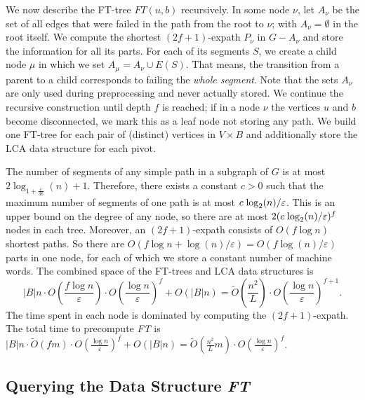 \documentclass{theoretics}
\newcommand*{\Otilde}{\widetilde{O}}
\newcommand*{\nwspace}{\hspace*{.1em}}
\newcommand{\eps}{\varepsilon}
\begin{document}
We now describe the FT-tree $FT(u,b)$ recursively.
In some node $\nu$, let $A_{\nu}$ be the set of all edges
that were failed in the path from the root to $\nu$;
with $A_{\nu} = \emptyset$ in the root itself.
We compute the shortest $(2f{+}1)$-expath $P_{\nu}$ in $G-A_{\nu}$
and store the information for all its parts.
For each of its segments $S$, we create a child node $\mu$ in which we set
$A_{\mu} = A_{\nu} \cup E(S)$.
That means, the transition from a parent to a child corresponds to failing the \emph{whole segment}.
Note that the sets $A_{\nu}$ are only used during preprocessing and never actually stored.
We continue the recursive construction until depth $f$ is reached;
if in a node $\nu$ the vertices $u$ and $b$ become disconnected,
we mark this as a leaf node not storing any path.
We build one FT-tree for each pair of (distinct) vertices in $V \times B$
and additionally store the LCA data structure for each pivot.

The number of segments of any simple path in a subgraph of $G$ is at most
$2\log_{1+ \tfrac{\eps}{36}}(n) +1$.
Therefore, there exists a constant $c > 0$ such that
the maximum number of segments of one path is at most $c \nwspace \log_2(n)/\eps$.
This is an upper bound on the degree of any node,
so there are at most $2(c \nwspace \log_2(n)/\eps)^f$ nodes in each tree.
Moreover, an $(2f{+}1)$-expath consists of $O(f \log n)$
shortest paths.
So there are $O(f\log n+ \log(n)/\eps) = O(f \log (n)/\varepsilon)$ parts in one node,
for each of which we store a constant number of machine words.
The combined space of the FT-trees and LCA data structures is
\begin{equation*}
 |B|n \cdot O\!\left(\frac{f\log n}{\varepsilon}\right) \cdot O\!\left(\frac{\log n}{\varepsilon}\right)^{f} + O(|B|n)
 	= \Otilde\!\left(\frac{n^2}{L}\right)
 		\cdot O\!\left(\frac{\log n}{\varepsilon}\right)^{f+1}.
\end{equation*}
The time spent in each node is dominated by computing the $(2f{+}1)$-expath.
The total time to precompute \emph{FT} is
  $|B|n \cdot \Otilde(fm) \cdot O\!\left(\frac{\log n}{\varepsilon}\right)^f + O(|B|n)
    = \Otilde\!\left(\frac{n^2}{L} m \right) 
    	\cdot O\!\left(\frac{\log n}{\varepsilon}\right)^f$.


\subsection{Querying the Data Structure \texorpdfstring{\emph{FT}}{FT}}
\label{subsec:sublinear_FT_query}
\end{document}
